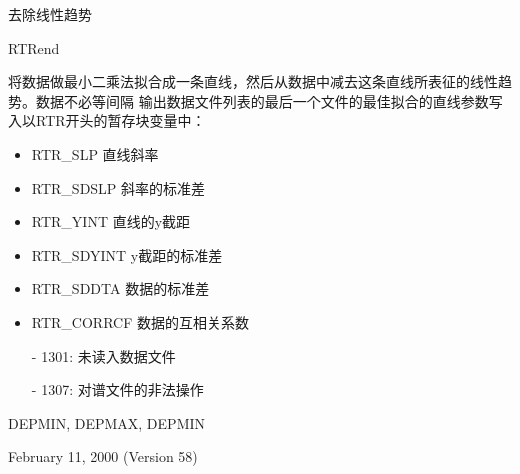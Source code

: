 \label{cmd:rtrend}

去除线性趋势

RTRend

将数据做最小二乘法拟合成一条直线，然后从数据中减去这条直线所表征的线性趋势。数据不必等间隔
输出数据文件列表的最后一个文件的最佳拟合的直线参数写入以RTR开头的暂存块变量中：
\begin{itemize}
\item RTR\_SLP 直线斜率
\item RTR\_SDSLP 斜率的标准差
\item RTR\_YINT 直线的y截距
\item RTR\_SDYINT y截距的标准差
\item RTR\_SDDTA 数据的标准差
\item RTR\_CORRCF 数据的互相关系数
\end{itemize}

\begin{itemize}
\item[-]1301: 未读入数据文件
\item[-]1307: 对谱文件的非法操作
\end{itemize}

DEPMIN, DEPMAX, DEPMIN

February 11, 2000 (Version 58)
